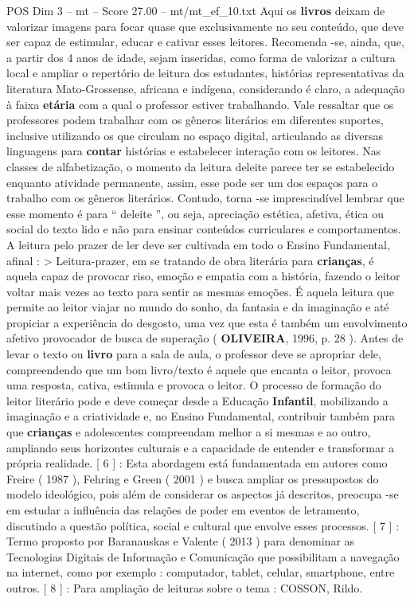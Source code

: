 \begin{textsample}{POS Dim 3 – mt – Score 27.00 – mt/mt\_ef\_10.txt}
Aqui os \textbf{livros} deixam de valorizar imagens para focar quase que exclusivamente no seu conteúdo, que deve ser capaz de estimular, educar e cativar esses leitores.
Recomenda -se, ainda, que, a partir dos 4 anos de idade, sejam inseridas, como forma de valorizar a cultura local e ampliar o repertório de leitura dos estudantes, histórias representativas da literatura Mato-Grossense, africana e indígena, considerando é claro, a adequação à faixa \textbf{etária} com a qual o professor estiver trabalhando.
Vale ressaltar que os professores podem trabalhar com os gêneros literários em diferentes suportes, inclusive utilizando os que circulam no espaço digital, articulando as diversas linguagens para \textbf{contar} histórias e estabelecer interação com os leitores.
Nas classes de alfabetização, o momento da leitura deleite parece ter se estabelecido enquanto atividade permanente, assim, esse pode ser um dos espaços para o trabalho com os gêneros literários.
Contudo, torna -se imprescindível lembrar que esse momento é para “ deleite ”, ou seja, apreciação estética, afetiva, ética ou social do texto lido e não para ensinar conteúdos curriculares e comportamentos.
A leitura pelo prazer de ler deve ser cultivada em todo o Ensino Fundamental, afinal : > Leitura-prazer, em se tratando de obra literária para \textbf{crianças}, é aquela capaz de provocar riso, emoção e empatia com a história, fazendo o leitor voltar mais vezes ao texto para sentir as mesmas emoções.
É aquela leitura que permite ao leitor viajar no mundo do sonho, da fantasia e da imaginação e até propiciar a experiência do desgosto, uma vez que esta é também um envolvimento afetivo provocador de busca de superação ( \textbf{OLIVEIRA}, 1996, p. 28 ).
Antes de levar o texto ou \textbf{livro} para a sala de aula, o professor deve se apropriar dele, compreendendo que um bom livro/texto é aquele que encanta o leitor, provoca uma resposta, cativa, estimula e provoca o leitor.
O processo de formação do leitor literário pode e deve começar desde a Educação \textbf{Infantil}, mobilizando a imaginação e a criatividade e, no Ensino Fundamental, contribuir também para que \textbf{crianças} e adolescentes compreendam melhor a si mesmas e ao outro, ampliando seus horizontes culturais e a capacidade de entender e transformar a própria realidade. [ 6 ] : Esta abordagem está fundamentada em autores como Freire ( 1987 ), Fehring e Green ( 2001 ) e busca ampliar os pressupostos do modelo ideológico, pois além de considerar os aspectos já descritos, preocupa -se em estudar a influência das relações de poder em eventos de letramento, discutindo a questão política, social e cultural que envolve esses processos. [ 7 ] : Termo proposto por Baranauskas e Valente ( 2013 ) para denominar as Tecnologias Digitais de Informação e Comunicação que possibilitam a navegação na internet, como por exemplo : computador, tablet, celular, smartphone, entre outros. [ 8 ] : Para ampliação de leituras sobre o tema : COSSON, Rildo.

\end{textsample}
